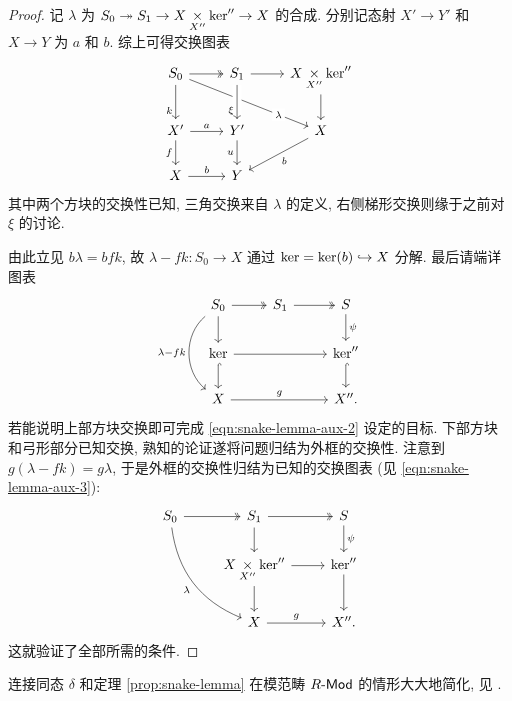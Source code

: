 \begin{proof}
	记 $\lambda$ 为 $S_0 \twoheadrightarrow S_1 \to X \underset{X''}{\times} \operatorname{ker}'' \to X$ 的合成. 分别记态射 $X' \to Y'$ 和 $X \to Y$ 为 $a$ 和 $b$. 综上可得交换图表
	\[\begin{tikzcd}
		S_0 \arrow[twoheadrightarrow, r] \arrow[d, "k"' near end] \arrow[rrd, "\lambda" description, near end] & S_1 \arrow[d, crossing over, "\xi"' near end] \arrow[r] & X \dtimes{X''} \Ker'' \arrow[d] \\
		X' \arrow[r, "a"] \arrow[d, "f"'] & Y' \arrow[d, "u"'] & X \arrow[ld, "b"] \\
		X \arrow[r, "b"] & Y &
	\end{tikzcd}\]
	其中两个方块的交换性已知, 三角交换来自 $\lambda$ 的定义, 右侧梯形交换则缘于之前对 $\xi$ 的讨论.
	
	由此立见 $b\lambda = bfk$, 故 $\lambda - fk: S_0 \to X$ 通过 $\operatorname{ker} = \operatorname{ker}(b) \hookrightarrow X$ 分解. 最后请端详图表
	\[\begin{tikzcd}
		S_0 \arrow[twoheadrightarrow, r] \arrow[d] \arrow[dd, bend right=50, "{\lambda -fk}"'] & S_1 \arrow[twoheadrightarrow, r] & S \arrow[d, "\psi"] \\
		\Ker \arrow[hookrightarrow, d] \arrow[rr] & & \Ker'' \arrow[hookrightarrow, d] \\
		X \arrow[rr, "g"] & & X'' .
	\end{tikzcd}\]
	若能说明上部方块交换即可完成 \eqref{eqn:snake-lemma-aux-2} 设定的目标. 下部方块和弓形部分已知交换, 熟知的论证遂将问题归结为外框的交换性. 注意到 $g(\lambda - fk) = g\lambda$, 于是外框的交换性归结为已知的交换图表 (见 \eqref{eqn:snake-lemma-aux-3}):
	\[\begin{tikzcd}
		S_0 \arrow[twoheadrightarrow, r] \arrow[rdd, bend right, "\lambda"'] & S_1 \arrow[twoheadrightarrow, r] \arrow[d] & S \arrow[d, "\psi"] \\
		& X \dtimes{X''} \Ker'' \arrow[r] \arrow[d] & \Ker'' \arrow[d] \\
		& X \arrow[r, "g"] & X'' .
	\end{tikzcd}\]
	这就验证了全部所需的条件.
\end{proof}

连接同态 $\delta$ 和定理 \ref{prop:snake-lemma} 在模范畴 $R\text{-}\mathsf{Mod}$ 的情形大大地简化, 见 \cite[命题 6.8.6]{Li1}.

